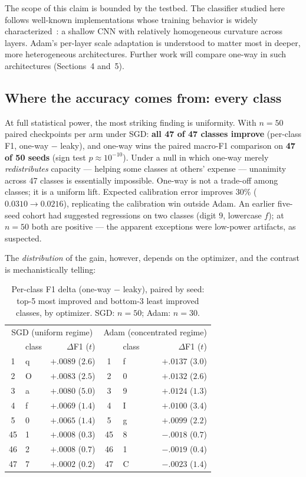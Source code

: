 \documentclass[11pt]{article}
\begin{document}
The scope of this claim is bounded by the testbed. The classifier
studied here follows well-known implementations whose training behavior
is widely
characterized~\cite{lecun1998mnist,paszke2019pytorch}: a shallow CNN
with relatively homogeneous curvature across layers. Adam's per-layer
scale adaptation is understood to matter most in deeper, more
heterogeneous architectures. Further work will compare one-way in such
architectures (Sections~4 and~5).

\subsection{Where the accuracy comes from: every class}

At full statistical power, the most striking finding is uniformity.
With $n{=}50$ paired checkpoints per arm under SGD:
\textbf{all 47 of 47 classes improve} (per-class F1,
one-way $-$ leaky), and one-way wins the paired macro-F1 comparison
on \textbf{47 of 50 seeds} (sign test $p \approx 10^{-10}$). Under a
null in which one-way merely \emph{redistributes} capacity --- helping
some classes at others' expense --- unanimity across 47 classes is
essentially impossible. One-way is not a trade-off among classes; it
is a uniform lift. Expected calibration error improves 30\%
($0.0310 \to 0.0216$), replicating the calibration win outside Adam.
An earlier five-seed cohort had suggested regressions on two classes
(digit $9$, lowercase $f$); at $n{=}50$ both are positive --- the
apparent exceptions were low-power artifacts, as suspected.

The \emph{distribution} of the gain, however, depends on the
optimizer, and the contrast is mechanistically telling:

\begin{table}[H]
\centering
\caption{Per-class F1 delta (one-way $-$ leaky), paired by seed:
top-5 most improved and bottom-3 least improved classes, by optimizer.
SGD: $n{=}50$; Adam: $n{=}30$.}
\label{tab:perclass}
\begin{tabular}{clr|clr}
\toprule
\multicolumn{3}{c|}{SGD (uniform regime)} &
\multicolumn{3}{c}{Adam (concentrated regime)} \\
 & class & $\Delta$F1 ($t$) & & class & $\Delta$F1 ($t$) \\
\midrule
1 & q & $+.0089$ ($2.6$) & 1 & f & $+.0137$ ($3.0$) \\
2 & O & $+.0083$ ($2.5$) & 2 & 0 & $+.0132$ ($2.6$) \\
3 & a & $+.0080$ ($5.0$) & 3 & 9 & $+.0124$ ($1.3$) \\
4 & f & $+.0069$ ($1.4$) & 4 & I & $+.0100$ ($3.4$) \\
5 & 0 & $+.0065$ ($1.4$) & 5 & g & $+.0099$ ($2.2$) \\
\midrule
45 & 1 & $+.0008$ ($0.3$) & 45 & 8 & $-.0018$ ($0.7$) \\
46 & 2 & $+.0008$ ($0.7$) & 46 & 1 & $-.0019$ ($0.4$) \\
47 & 7 & $+.0002$ ($0.2$) & 47 & C & $-.0023$ ($1.4$) \\
\bottomrule
\end{tabular}
\end{table}
\end{document}
